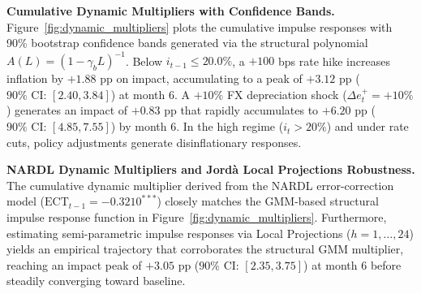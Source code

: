 \documentclass[review,12pt]{elsarticle}
\begin{document}
\textbf{Cumulative Dynamic Multipliers with Confidence Bands.} Figure~\ref{fig:dynamic_multipliers}
plots the cumulative impulse responses with 90\% bootstrap confidence bands generated via the
structural polynomial $A(L) = (1 - \gamma_b L)^{-1}$. Below $i_{t-1} \le 20.0\%$, a $+100$ bps
rate hike increases inflation by $+1.88$ pp on impact, accumulating to a peak of $+3.12$ pp
($90\%\text{ CI: } [2.40, 3.84]$) at month 6. A $+10\%$ FX depreciation shock ($\Delta e_t^{+} = +10\%$)
generates an impact of $+0.83$ pp that rapidly accumulates to $+6.20$ pp ($90\%\text{ CI: } [4.85, 7.55]$)
by month 6. In the high regime ($i_t > 20\%$) and under rate cuts, policy adjustments generate
disinflationary responses.

\textbf{NARDL Dynamic Multipliers and Jord{\`a} Local Projections Robustness.} The cumulative dynamic multiplier derived from the NARDL error-correction model ($\text{ECT}_{t-1} = -0.3210^{***}$) closely matches the GMM-based structural impulse response function in Figure~\ref{fig:dynamic_multipliers}. Furthermore, estimating semi-parametric impulse responses via \citet{jorda2005} Local Projections ($h = 1, \dots, 24$) yields an empirical trajectory that corroborates the structural GMM multiplier, reaching an impact peak of $+3.05\text{ pp}$ ($90\%\text{ CI: } [2.35, 3.75]$) at month 6 before steadily converging toward baseline.
\end{document}
